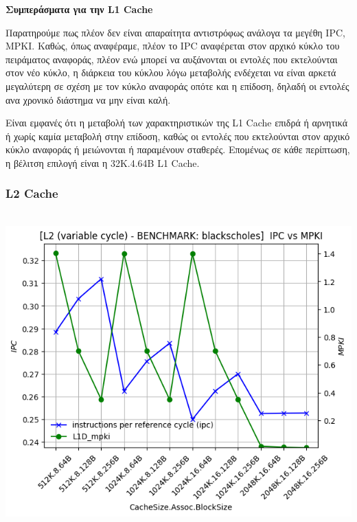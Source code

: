 \newpage
\begin{center}
    \textbf{Συμπεράσματα για την \textlatin{L1 Cache}}    
\end{center}

Παρατηρούμε πως πλέον δεν είναι απαραίτητα αντιστρόφως ανάλογα τα μεγέθη
\textlatin{IPC, MPKI}. Καθώς, όπως αναφέραμε, πλέον το IPC αναφέρεται στον
αρχικό κύκλο του πειράματος αναφοράς, πλέον ενώ μπορεί να αυξάνονται οι εντολές
που εκτελούνται στον νέο κύκλο, η διάρκεια του κύκλου λόγω μεταβολής ενδέχεται
να είναι αρκετά μεγαλύτερη σε σχέση με τον κύκλο αναφοράς οπότε και η επίδοση,
δηλαδή οι εντολές ανα χρονικό διάστημα να μην είναι καλή.

Είναι εμφανές ότι η μεταβολή των χαρακτηριστικών της L1 Cache επιδρά ή αρνητικά 
ή χωρίς καμία μεταβολή στην επίδοση, καθώς οι εντολές που εκτελούνται στον αρχικό 
κύκλο αναφοράς ή μειώνονται ή παραμένουν σταθερές. Επομένως σε κάθε περίπτωση, 
η βέλιτση επιλογή είναι η 32K.4.64B L1 Cache.


\newpage
\subsubsection{L2 Cache}

\begin{minipage}{\textwidth}
    \begin{center}
        \\
        \vspace{3mm}
        \includegraphics[scale=0.65]{graphs/L2/var/blackscholes.png}
        \vspace{6mm}
    \end{center}
\end{minipage}


